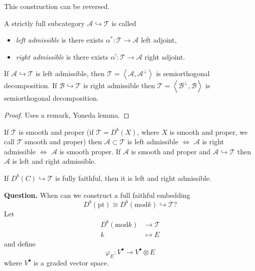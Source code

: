 This construction can be reversed.

\begin{definition}
\label{definition-left-and-right-admissible-subcategories}
A strictly full subcategory $\mathcal{A} \hookrightarrow  \mathcal{T}$ is called
\begin{itemize}
\item {\it left admissible} is there exists $\alpha^*:\mathcal{T} \to
\mathcal{A}$ left adjoint,
\item {\it right admissible} is there exists $\alpha^!:\mathcal{T} \to
\mathcal{A}$ right adjoint.
\end{itemize}
\end{definition}

\begin{lemma}
\label{lemma-admissible-implies-semiorthogonal-decomposition}
If $\mathcal{A} \hookrightarrow  \mathcal{T}$ is left admissible, then
$\mathcal{T}=\left<\mathcal{A},\mathcal{A}^\perp\right>$ is semiorthogonal
decomposition. If
$\mathcal{B} \hookrightarrow  \mathcal{T}$ is right admissible then
$\mathcal{T}=\left<\mathcal{B}^\perp, \mathcal{B}\right>$ is semiorthogonal
decomposition.
\end{lemma}

\begin{proof}
Uses a remark, Yoneda lemma.
\end{proof}

\begin{proposition}
\label{proposition-Bondall-Van-der-Borgh}
If $\mathcal{T}$ is smooth and proper (if $\mathcal{T}=D^b(X)$, where $X$ is
smooth and proper, we call $\mathcal{T}$ smooth and proper) then
$\mathcal{A} \subset \mathcal{T}$ is left admissible $\iff$ $\mathcal{A}$ is
right admissible $\iff$ $\mathcal{A}$ is smooth proper. If $\mathcal{A}$ is
smooth and proper and $\mathcal{A} \hookrightarrow  \mathcal{T}$ then
$\mathcal{A}$ is left and right admissible.
\end{proposition}

\medskip\noindent
If $D^b(C) \hookrightarrow  \mathcal{T}$ is fully faithful, then it is left and
right admissible.

{\bf Question.} When can we construct a full faithful embedding
 $$
D^b(\text{pt})\cong D^b(\text{mod}k) \hookrightarrow  \mathcal{T}?
$$
Let \begin{align*}
D^b(\text{mod}k) &\longrightarrow \mathcal{T} \\
k &\longmapsto E
\end{align*}
and define
$$
\varphi_E:V^\bullet \to V^\bullet \otimes E
$$
where $V^\bullet$ is a graded vector space.

